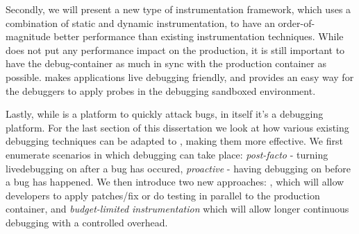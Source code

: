 Secondly, we will present \iprobe a new type of instrumentation framework, which uses a combination of static and dynamic instrumentation, to have an order-of-magnitude better performance than existing instrumentation techniques. 
While \livedebugging does not put any performance impact on the production, it is still important to have the debug-container as much in sync with the production container as possible. 
\iprobe makes applications live debugging friendly, and provides an easy way for the debuggers to apply probes in the debugging sandboxed environment.

\iffalse
Thirdly, we will present a mechanism to create overhead budgets for instrumentation in the debug container to make \livedebugging more robust, and longer lasting.
This will be split in two different kinds of techniques: Firstly, we will provide pro-active mechanism to find an instrumentation overhead budget. This is based on queuing theory, simulations, and testing results. 
Secondly: we will provide a reactive mechanism to modify instrumentation overhead. 
We will use the buffer size and usage as a trigger and present novel sampling techniques together with statistical testing mechanism to effectively isolate bugs.
\fi

Lastly, while \parikshan is a platform to quickly attack bugs, in itself it's a debugging platform. 
For the last section of this dissertation we look at how various existing debugging techniques can be adapted to \livedebugging, making them more effective. 
We first enumerate scenarios in which debugging can take place: \emph{post-facto} - turning livedebugging on after a bug has occured, \emph{proactive} - having debugging on before a bug has happened.
We then introduce two new approaches: \activedebugging, which will allow developers to apply patches/fix or do testing in parallel to the production container, and \emph{budget-limited instrumentation} which will allow longer continuous debugging with a controlled overhead.

